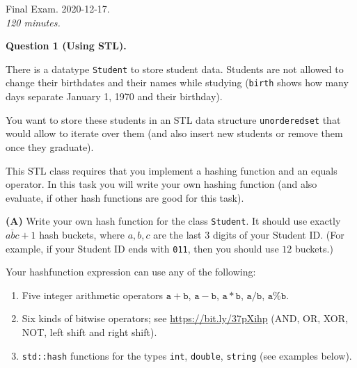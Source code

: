 \documentclass[a4paper,12pt]{article}
\begin{document}
\thispagestyle{empty}

\twocolumn

\begin{center}
{\Large Final Exam. 2020-12-17.}\\
{\em 120 minutes.} 
\end{center}


% 
\vspace{10pt}
{\bf Question 1 (Using STL).} 




There is a datatype {\tt Student} to store student data. 
Students are not allowed to change their
birthdates and their names while studying ({\tt birth} shows 
how many days separate January 1, 1970 and their birthday).

\vspace{5pt}
You want to store these students in an STL 
data structure {\tt unordered\textunderscore{}set} 
that would allow to iterate over them (and also insert new students
or remove them once they graduate). 

This STL class requires that you implement a hashing function and
an equals operator.
In this task you will write your own hashing function
(and also evaluate, if other hash functions are good for this task).

\vspace{5pt}
{\bf (A)} Write your own hash function for the class {\tt Student}. 
It should use exactly $\overline{abc}+1$ hash buckets, 
where $a,b,c$ are the last $3$ digits of your Student ID. 
(For example, if your Student ID ends with {\tt 011}, then 
you should use $12$ buckets.)

Your hashfunction expression can use any of the following: 
\begin{enumerate}
\item Five integer arithmetic operators $\mathtt{a+b}$, $\mathtt{a-b}$, 
$\mathtt{a \ast b}$, $\mathtt{a/b}$, $\mathtt{a\%b}$. 
\item Six kinds of bitwise operators;  
see \url{https://bit.ly/37pXihp} (AND, OR, XOR, NOT, left shift and
right shift). 
\item {\tt std::hash} functions for the types {\tt int}, 
{\tt double}, {\tt string} (see examples below).
\end{enumerate}
\end{document}
